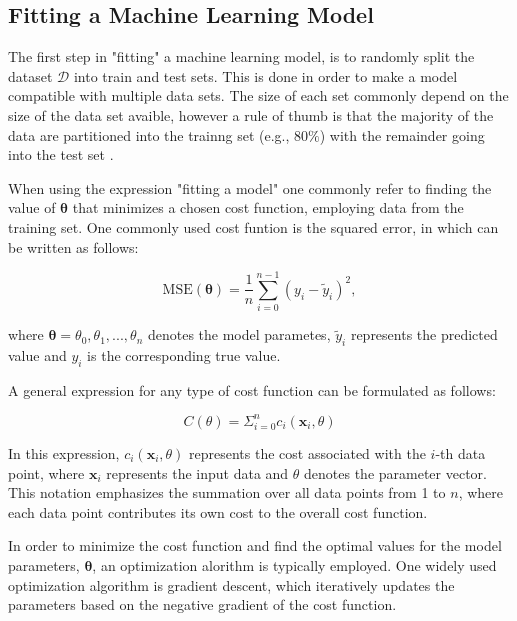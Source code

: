 \documentclass[a4paper, UKenglish, 11pt]{uiomaster}
\begin{document}
\subsection{Fitting a Machine Learning Model}
The first step in "fitting" a machine learning model, is to randomly split the dataset $\mathcal{D}$ into train and test sets. This is done in order to make a model compatible with multiple data sets. The size of each set commonly depend on the size of the data set avaible, however a rule of thumb is that the majority of the data are partitioned into the trainng set (e.g., 80$\%$) with the remainder going into the test set \cite{mehta2019high}.

When using the expression "fitting a model" one commonly refer to finding the value of $\boldsymbol{\theta}$ that minimizes a chosen cost function, employing data from the training set. One commonly used cost funtion is the squared error, in which can be written as follows:

\begin{equation}
\text{MSE}(\boldsymbol{\theta}) = \frac{1}{n}
\sum_{i=0}^{n-1}(y_i-\tilde{y}_i)^2 ,
\label{eq:MSE}
\end{equation}

where $\boldsymbol{\theta} = \theta_0, \theta_1, ..., \theta_n$ denotes the model parametes, $\tilde{y}_i$ represents the predicted value and $y_i$ is the corresponding true value.

A general expression for any type of cost function can be formulated as follows:

\begin{equation}
C(\theta) = \Sigma^n_{i=0}c_i(\textbf{x}_i, \theta)
\end{equation}

In this expression, $c_i(\textbf{x}_i, \theta)$ represents the cost associated with the $i$-th data point, where $\textbf{x}_i$ represents the input data and $\theta$ denotes the parameter vector. This notation emphasizes the summation over all data points from 1 to $n$, where each data point contributes its own cost to the overall cost function.

In order to minimize the cost function and find the optimal values for the model parameters, $\boldsymbol{\theta}$, an optimization alorithm is typically employed. One widely used optimization algorithm is gradient descent, which iteratively updates the parameters based on the negative gradient of the cost function.
\end{document}
